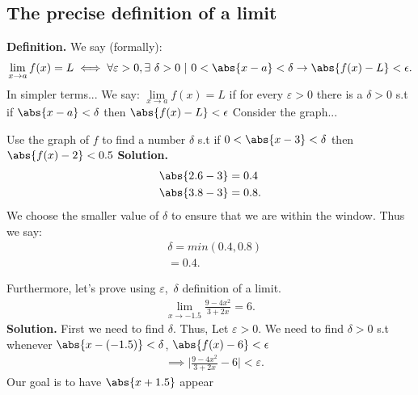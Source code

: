 \documentclass{report}
\begin{document}
      \subsection{The precise definition of a limit}
      \bigbreak \noindent 
      \textbf{Definition. }  We say (formally):
      \begin{align*}
        \lim\limits_{x \to a}{f(x) = L} \iff \forall \varepsilon > 0, \exists\ \delta > 0\ |\ 0 < \abs{x-a} < \delta \rightarrow \abs{f(x) - L} < \epsilon
      .\end{align*}
      \bigbreak \noindent 
      In simpler terms... We say: $ \lim\limits_{x \to a}{f(x) = L}$ if for every $\varepsilon > 0$ there is a $\delta > 0$ s.t if $\abs{x-a}<\delta$ then $\abs{f(x) - L} < \epsilon$
      \bigbreak \noindent 
      Consider the graph...
      \bigbreak \noindent 
      \begin{minipage}[]{0.47\textwidth}
      \end{minipage}
      \begin{minipage}[]{0.47\textwidth}
        Use the graph of $f$ to find a number $\delta$ s.t if $0 < \abs{x-3}<\delta$ then $\abs{f(x) - 2} < 0.5$ 
        \bigbreak \noindent 
        \textbf{Solution.} 
        \begin{align*}
          &\abs{2.6 -3} = 0.4 \\
          &\abs{3.8 - 3} = 0.8
        .\end{align*}
        We choose the smaller value of $\delta $ to ensure that we are within the window. Thus we say:
        \begin{align*}
          &\delta = min(0.4, 0.8) \\
          &=0.4
        .\end{align*}
      \end{minipage}
      \bigbreak \noindent 
      Furthermore, let's prove using $\varepsilon$,\ $\delta$ definition of a limit.
      \begin{align*}
        \lim\limits_{x \to -1.5}{\frac{9-4x^{2}}{3+2x}} =6
      .\end{align*}
      \bigbreak \noindent 
      \textbf{Solution.} First we need to find $\delta$. Thus, Let $\varepsilon > 0 $. We need to find $\delta >0$ s.t whenever $\abs{x-(-1.5)} < \delta$, $\abs{f(x) - 6} < \epsilon$
      \begin{align*}
        &\implies \bigg|\frac{9-4x^{2}}{3+2x} -6\bigg| < \varepsilon
      .\end{align*}
      Our goal is to have $\abs{x+1.5}$ appear
\end{document}
